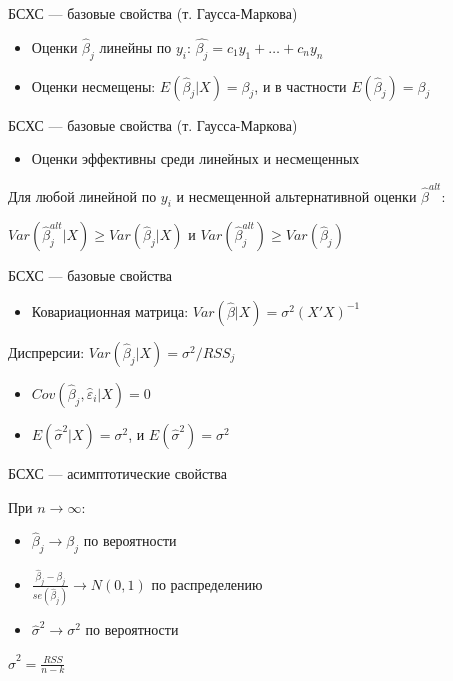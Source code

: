 \documentclass[ignorenonframetext,]{beamer}
\begin{document}
\begin{frame}{БСХС --- базовые свойства (т. Гаусса-Маркова)}

\begin{itemize}
\item
  Оценки $\hat{\beta}_j$ линейны по $y_i$:
  $\hat{\beta_j}=c_1 y_1 + \ldots + c_n y_n$
\item
  Оценки несмещены: $E(\hat{\beta}_j |X )=\beta_j$, и в частности
  $E(\hat{\beta}_j)=\beta_j$
\end{itemize}

\end{frame}

\begin{frame}{БСХС --- базовые свойства (т. Гаусса-Маркова)}

\begin{itemize}
\itemsep1pt\parskip0pt
\item
  Оценки эффективны среди линейных и несмещенных
\end{itemize}

Для любой линейной по $y_i$ и несмещенной альтернативной оценки
$\hat{\beta}^{alt}$:

$Var(\hat{\beta}_j^{alt} | X)\geq Var(\hat{\beta}_j | X)$ и
$Var(\hat{\beta}_j^{alt} )\geq Var(\hat{\beta}_j )$

\end{frame}

\begin{frame}{БСХС --- базовые свойства}

\begin{itemize}
\itemsep1pt\parskip0pt
\item
  Ковариационная матрица: $Var(\hat{\beta} | X )=\sigma^2 (X'X)^{-1}$
\end{itemize}

Диспрерсии: $Var(\hat{\beta}_j| X)=\sigma^2/RSS_j$

\begin{itemize}
\itemsep1pt\parskip0pt
\item
  $Cov(\hat{\beta}_j,\hat{\varepsilon}_i | X)=0$
\item
  $E(\hat{\sigma}^2 |X ) = \sigma^2$, и $E(\hat{\sigma}^2 ) = \sigma^2$
\end{itemize}

\end{frame}

\begin{frame}{БСХС --- асимптотические свойства}

При $n\to \infty$:

\begin{itemize}
\itemsep1pt\parskip0pt
\item
  $\hat{\beta}_j \to \beta_j$ по вероятности
\item
  $\frac{\hat{\beta}_j-\beta_j}{se(\hat{\beta}_j)} \to N(0,1)$ по
  распределению
\item
  $\hat{\sigma}^2 \to \sigma^2 $ по вероятности
\end{itemize}

$\hat{\sigma}^2=\frac{RSS}{n-k}$

\end{frame}
\end{document}
